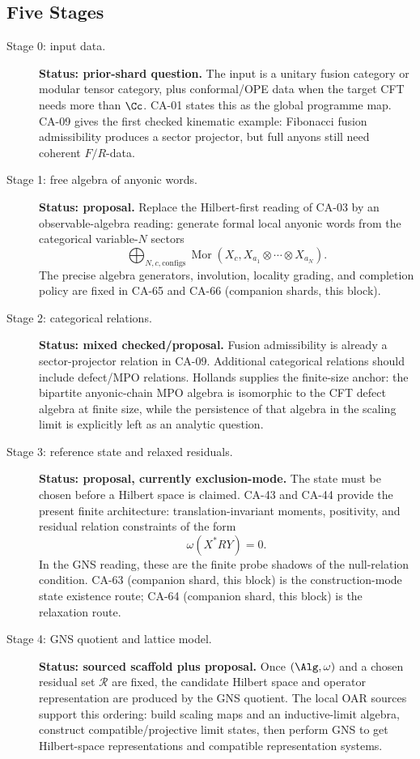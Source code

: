 \subsection{Five Stages}

\begin{description}
\item[Stage 0: input data.]
\textbf{Status: prior-shard question.}  The input is a unitary fusion category
or modular tensor category, plus conformal/OPE data when the target CFT needs
more than \(\Cc\).  CA-01 states this as the global programme map.  CA-09 gives
the first checked kinematic example: Fibonacci fusion admissibility produces a
sector projector, but full anyons still need coherent \(F/R\)-data.

\item[Stage 1: free algebra of anyonic words.]
\textbf{Status: proposal.}  Replace the Hilbert-first reading of CA-03 by an
observable-algebra reading: generate formal local anyonic words from the
categorical variable-\(N\) sectors
\[
  \bigoplus_{N,c,\mathrm{configs}}
  \operatorname{Mor}(X_c,X_{a_1}\otimes\cdots\otimes X_{a_N}).
\]
The precise algebra generators, involution, locality grading, and completion
policy are fixed in CA-65 and CA-66 (companion shards, this block).

\item[Stage 2: categorical relations.]
\textbf{Status: mixed checked/proposal.}  Fusion admissibility is already a
sector-projector relation in CA-09.  Additional categorical relations should
include defect/MPO relations.  Hollands supplies the finite-size anchor: the
bipartite anyonic-chain MPO algebra is isomorphic to the CFT defect algebra at
finite size, while the persistence of that algebra in the scaling limit is
explicitly left as an analytic question.

\item[Stage 3: reference state and relaxed residuals.]
\textbf{Status: proposal, currently exclusion-mode.}  The state must be chosen
before a Hilbert space is claimed.  CA-43 and CA-44 provide the present finite
architecture: translation-invariant moments, positivity, and residual relation
constraints of the form
\[
  \omega(X^*RY)=0.
\]
In the GNS reading, these are the finite probe shadows of the null-relation
condition.  CA-63 (companion shard, this block) is the construction-mode state
existence route; CA-64 (companion shard, this block) is the relaxation route.

\item[Stage 4: GNS quotient and lattice model.]
\textbf{Status: sourced scaffold plus proposal.}  Once \((\Alg,\omega)\) and a
chosen residual set \(\mathcal R\) are fixed, the candidate Hilbert space and
operator representation are produced by the GNS quotient.  The local OAR
sources support this ordering: build scaling maps and an inductive-limit
algebra, construct compatible/projective limit states, then perform GNS to get
Hilbert-space representations and compatible representation systems.


\end{description}
